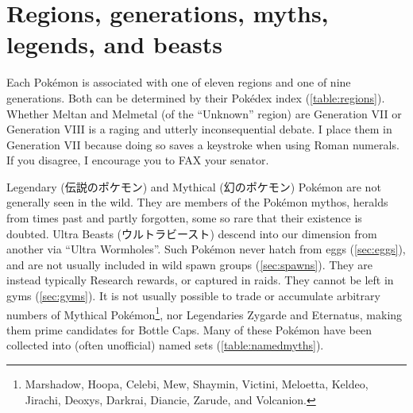 \section{Regions, generations, myths, legends, and beasts\label{sec:regions}}
Each Pokémon is associated with one of eleven regions and one of nine generations.
Both can be determined by their Pokédex index (\autoref{table:regions}).
Whether Meltan and Melmetal (of the ``Unknown'' region) are Generation VII
  or Generation VIII is a raging and utterly inconsequential debate.
I place them in Generation VII because doing so saves a keystroke when using Roman numerals.
If you disagree, I encourage you to FAX your senator.

Legendary (\textjapanese{伝説のポケモン}) and Mythical (\textjapanese{幻のポケモン}) Pokémon
 are not generally seen in the wild.
They are members of the Pokémon mythos, heralds from times past and partly forgotten,
  some so rare that their existence is doubted.
Ultra Beasts (\textjapanese{ウルトラビースト}) descend into our dimension from
  another via ``Ultra Wormholes''.
Such Pokémon never hatch from eggs (\autoref{sec:eggs}), and are not usually included in wild spawn groups (\autoref{sec:spawns}).
They are instead typically Research rewards, or captured in raids.
They cannot be left in gyms (\autoref{sec:gyms}).
It is not usually possible to trade or accumulate arbitrary numbers of Mythical
  Pokémon\footnote{Marshadow, Hoopa, Celebi, Mew, Shaymin, Victini, Meloetta, Keldeo,
  Jirachi, Deoxys,
  Darkrai, Diancie, Zarude, and Volcanion.}, nor Legendaries Zygarde and
  Eternatus, making them prime candidates for Bottle Caps.
Many of these Pokémon have been collected into (often unofficial) named sets (\autoref{table:namedmyths}).

